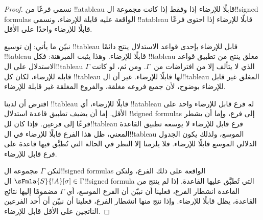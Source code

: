 \documentclass[../../../include/open-logic-section]{subfiles}
\begin{document}
\begin{proof}
نسمي فرعًا من !!a{tableau} قابلًا للإرضاء إذا وفقط إذا كانت مجموعة
ال!!{signed formula}s الواقعة عليه قابلة للإرضاء، ونسمي !!a{tableau}
قابلًا للإرضاء إذا احتوى فرعًا قابلًا للإرضاء واحدًا على الأقل.

نبيّن ما يأتي: إن توسيع !!{tableau} قابل للإرضاء بإحدى قواعد الاستدلال
ينتج دائمًا !!{tableau} قابلًا للإرضاء. وهذا يثبت المبرهنة: فكل
!!{tableau} مغلق ينتج من تطبيق قواعد الاستدلال على ال!!{tableau} الذي
لا يتألف إلا من افتراضات من~$\Gamma$. ومن ثم، لو كانت $\Gamma$ قابلة
للإرضاء، لكان كل !!{tableau} لها قابلًا للإرضاء. غير أن ال!!{tableau}
المغلق غير قابل للإرضاء بوضوح، لأن جميع فروعه مغلقة، والفروع المغلقة
غير قابلة للإرضاء.

افترض أن لدينا !!{tableau} قابلًا للإرضاء، أي !!a{tableau} له فرع
قابل للإرضاء واحد على الأقل. إما أن يضيف تطبيق قاعدة استدلال
!!{signed formula}s إلى فرع، وإما أن يشطر فرعًا إلى فرعين. فإذا كان
لل!!{tableau} فرع قابل للإرضاء لا يوسعه تطبيق القاعدة المعني، ظل هذا
الفرع قابلًا للإرضاء في ال!!{tableau} الموسع، ولذلك يكون الجدول الدلالي
الموسع قابلًا للإرضاء. فلا يلزمنا إلا النظر في الحالة التي تُطبَّق
فيها قاعدة على فرع قابل للإرضاء.

لتكن $\Gamma$ مجموعة ال!!{signed formula}s الواقعة على ذلك الفرع،
ولتكن $\sFmla{S}{!A}[\sigma] \in \Gamma$ ال!!{signed formula} التي
تُطبَّق عليها القاعدة. إذا لم ينتج من القاعدة انشطار الفرع، فعلينا أن
نبيّن أن الفرع الموسع، أي $\Gamma$ مضمومًا إليها نتائج القاعدة، يظل
قابلًا للإرضاء. وإذا نتج منها انشطار الفرع، فعلينا أن نبيّن أن أحد
الفرعين الناتجين على الأقل قابل للإرضاء.


\end{proof}
\end{document}
